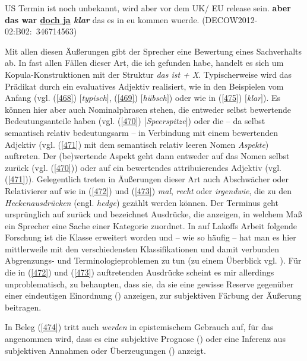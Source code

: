 \begin{exe}
	\ex\label{475} 
	US Termin ist noch unbekannt, wird aber vor dem UK/ EU release sein. \textbf{aber das war \underline{doch ja} \textit{klar}} das es in eu kommen 			wuerde.    
	\newline		                                              
	\hbox{}\hfill\hbox{(DECOW2012-02:B02: 346714563)}
\end{exe} 
Mit allen diesen Äußerungen gibt der Sprecher eine Bewertung eines Sachverhalts ab. In fast allen Fällen dieser Art, die ich gefunden habe, handelt es sich um Kopula-Konstruktionen mit der Struktur \textit{das ist + X}. Typischerweise wird das Prädikat durch ein eva\-luatives Adjektiv realisiert, wie in den Beispielen vom Anfang (vgl. (\ref{468}) $[$\textit{typisch}$]$, (\ref{469}) $[$\textit{hübsch}$]$) oder wie in (\ref{475}) $[$\textit{klar}$]$). Es können hier aber auch Nominalphrasen stehen, die entweder selbst bewertende Bedeutungsanteile haben (vgl. (\ref{470}) $[$\textit{Speerspitze}$]$) oder die – da selbst semantisch relativ bedeutungsarm – in Verbindung mit einem bewertenden Adjektiv (vgl. (\ref{471}) mit dem semantisch relativ leeren Nomen \textit{Aspekte}) auftreten. Der (be)wertende Aspekt geht dann entweder auf das Nomen selbst zurück (vgl. (\ref{470})) oder auf ein bewertendes attribuierendes Adjektiv (vgl. (\ref{471})). Gelegentlich treten in Äußerungen dieser Art auch Abschwächer oder Relativierer auf wie in (\ref{472}) und (\ref{473}) \textit{mal}, \textit{recht} oder \textit{irgendwie}, die zu den \textit{Heckenausdrücken} (engl. \textit{hedge})  gezählt werden können. Der Terminus geht ursprünglich auf \citet{Lakoff1973} zurück und be\-zeichnet Ausdrücke, die anzeigen, in welchem Maß ein Sprecher eine Sache einer Kategorie zuordnet. In auf Lakoffs Arbeit folgende Forschung ist die Klasse erweitert worden und – wie so häufig – hat man es hier mittlerweile mit den verschiedensten Klassifikationen und damit verbunden Abgrenzungs- und Terminologieproblemen zu tun (zu einem Überblick vgl. \citealt[Kapitel 3]{Clemen1998}). Für die in (\ref{472}) und (\ref{473}) auftretenden Ausdrücke scheint es mir allerdings unproblematisch, zu behaupten, dass sie, da sie eine \glqq gewisse Reserve gegenüber einer eindeutigen Einordnung\grqq{} (\citealt[10]{Clemen1998}) anzeigen, zur subjektiven Färbung  der Äußerung beitragen. 

In Beleg (\ref{474}) tritt auch \textit{werden} in epistemischem Gebrauch  auf, für das angenommen wird, dass es eine \glqq subjektive Prognose\grqq{}  (\citealt[39]{Clemen1998}) oder eine \glqq Inferenz aus subjektiven Annahmen oder Überzeugungen\grqq{} (\citealt[1901]{Zifonun1997}) anzeigt. 

